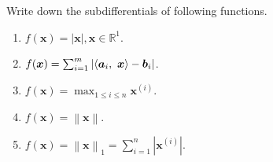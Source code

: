 \documentclass{article}
\newcommand{\aB}{\bm{a}}
\newcommand{\bB}{\bm{b}}
\newcommand{\xB}{\bm{x}}
\newcommand{\RBB}{\mathbb{R}}
\newcommand{\normgen}[1]{\left\| #1 \right\|}
\newcommand{\normone}[1]{\left\| #1 \right\|_1}
\begin{document}
\begin{excercise}\label{e1}
Write down the subdifferentials of following functions. 
\begin{enumerate}
	\item $f(\xB) = |\xB|, \xB \in \RBB^1$.\vspace{8pt}
	\item $f(\xB) = \sum_{i=1}^{m} | \innerproduct{\aB_i}{\xB} - \bB_i|$.\vspace{8pt}
	\item $f(\xB) = \max_{1 \leq i \leq n} \xB^{(i)}$.\vspace{8pt}
	\item $f(\xB) = \normgen{\xB}$.\vspace{8pt}
	\item $f(\xB) = \normone{\xB} = \sum_{i=1}^{n} |\xB^{(i)}|$.
\end{enumerate}
\end{excercise}
\end{document}
